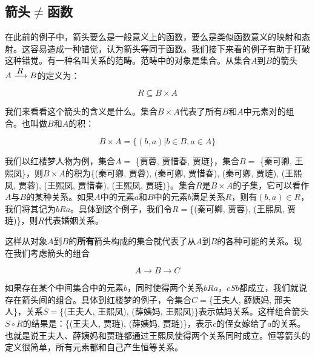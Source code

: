 \documentclass{article}
\begin{document}
\begin{Exercise}
\end{Exercise}

\subsection{箭头$\neq$函数}

在此前的例子中，箭头要么是一般意义上的函数，要么是类似函数意义的映射和态射。这容易造成一种错觉，认为箭头等同于函数。我们接下来看的例子有助于打破这种错觉。有一种名叫关系的范畴。范畴中的对象是集合。从集合$A$到$B$的箭头$A \arrowto{R} B$的定义为：

\[
R \subseteq B \times A
\]

我们来看看这个箭头的含义是什么。集合$B \times A$代表了所有$B$和$A$中元素对的组合。也叫做$B$和$A$的积：

\[
B \times A = \{(b, a) | b \in B, a \in A\}
\]

我们以红楼梦人物为例，集合$A =$ \{贾蓉, 贾惜春, 贾琏\}，集合$B =$ \{秦可卿, 王熙凤\}，则$B \times A$的积为\{(秦可卿, 贾蓉), (秦可卿, 贾惜春), (秦可卿, 贾琏), (王熙凤, 贾蓉), (王熙凤, 贾惜春), (王熙凤, 贾琏)\}。集合$R$是$B \times A$的子集，它可以看作$A$与$B$的某种关系。如果$A$中的元素$a$和$B$中的元素$b$满足关系$R$，则有$(b, a) \in R$，我们将其记为$bRa$。具体到这个例子，我们令$R=$\{(秦可卿, 贾蓉), (王熙凤, 贾琏)\}，则$R$代表婚姻关系。

这样从对象$A$到$B$的\textbf{所有}箭头构成的集合就代表了从$A$到$B$的各种可能的关系。现在我们考虑箭头的组合

\[
A \to B \to C
\]

如果存在某个中间集合中的元素$b$，同时使得两个关系$bRa$，$cSb$都成立，我们就说存在箭头间的组合。具体到红楼梦的例子，令集合$C=$\{王夫人, 薛姨妈, 邢夫人\}，关系$S=$\{(王夫人, 王熙凤), (薛姨妈, 王熙凤)\}表示姑妈关系。这样组合箭头$S \circ R$的结果是：\{(王夫人, 贾琏), (薛姨妈, 贾琏)\}，表示$c$的侄女嫁给了$a$的关系。也就是说王夫人、薛姨妈和贾琏都通过王熙凤使得两个关系同时成立。恒等箭头的定义很简单，所有元素都和自己产生恒等关系。
\end{document}
